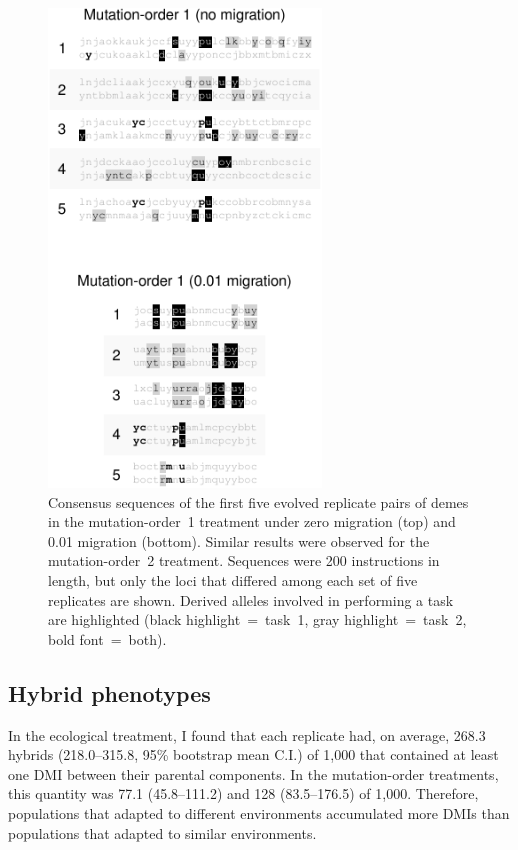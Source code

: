 \begin{doublespace}
\begin{figure}
\centering
\includegraphics[height=5in]{task-muts.pdf}
\caption{Consensus sequences of the first five evolved replicate pairs of demes
  in the mutation-order~1 treatment under zero migration (top)
  and 0.01 migration (bottom).
  Similar results were observed for the mu\-ta\-tion-order~2 treatment.
  Sequences were 200 instructions in length,
  but only the loci that differed among
  each set of five replicates are shown.
  Derived alleles involved in performing a task are highlighted
  (black highlight~=~task~1, gray highlight~=~task~2, bold font~=~both).}
\label{task_muts}
\end{figure}



\subsection{Hybrid phenotypes}

In the ecological treatment,
I found that each replicate had, on average,
268.3 hybrids (218.0--315.8, 95\% bootstrap mean C.I.) of 1,000
that contained at least one DMI between their parental components.
%
In the mutation-order treatments,
this quantity was 77.1 (45.8--111.2) and 128 (83.5--176.5) of 1,000.
%
Therefore, populations that adapted to different environments
accumulated more DMIs than populations that adapted to similar environments.




\end{doublespace}

